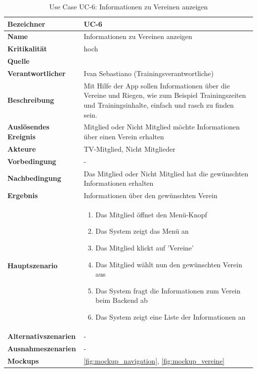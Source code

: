 \begin{table}[ht]
\centering
  \begin{tabular}{ l | p{10cm} }
	\hline
	\rowcolor{gray}
	\textbf{Bezeichner}		&	\textbf{UC-6}\\ \hline
	\textbf{Name}			&	Informationen zu Vereinen anzeigen\\ \hline
	\textbf{Kritikalität}		&	hoch\\ \hline
	\textbf{Quelle}			&	\glossarmark{Stakeholder}\\ \hline
	\textbf{Verantwortlicher}	&	Ivan Sebastiano (Trainingsverantwortliche)\\ \hline
	\textbf{Beschreibung}	&	Mit Hilfe der App sollen Informationen über die Vereine und Riegen, wie zum Beispiel Trainingszeiten und Trainingsinhalte, einfach und rasch zu finden sein.\\ \hline
	\textbf{Auslösendes Ereignis}&	Mitglied oder Nicht Mitglied möchte Informationen über einen Verein erhalten\\ \hline
	\textbf{Akteure}		&	TV-Mitglied, Nicht Mitglieder\\ \hline
	\textbf{Vorbedingung}	&	-\\ \hline
	\textbf{Nachbedingung}	&	Das Mitglied oder Nicht Mitglied hat die gewünschten Informationen erhalten\\ \hline
	\textbf{Ergebnis}		&	Informationen über den gewünschten Verein\\ \hline
	\textbf{Hauptszenario}	&	\begin{enumerate}
					\item Das Mitglied öffnet den Menü-Knopf
					\item Das System zeigt das Menü an
					\item Das Mitglied klickt auf 'Vereine'
					\item Das Mitglied wählt nun den gewünschten Verein aus
					\item Das System fragt die Informationen zum Verein beim Backend ab
					\item Das System zeigt eine Liste der Informationen an
					\end{enumerate}
					\\ \hline
	\textbf{Alternativszenarien}	&	-\\ \hline
	\textbf{Ausnahmeszenarien}&	-\\ \hline
	\textbf{Mockups}	 	&	\ref{fig:mockup_navigation}, \ref{fig:mockup_vereine}
  \end{tabular}
   \caption{Use Case UC-6: Informationen zu Vereinen anzeigen}\label{table:use_case_6}
\end{table}

